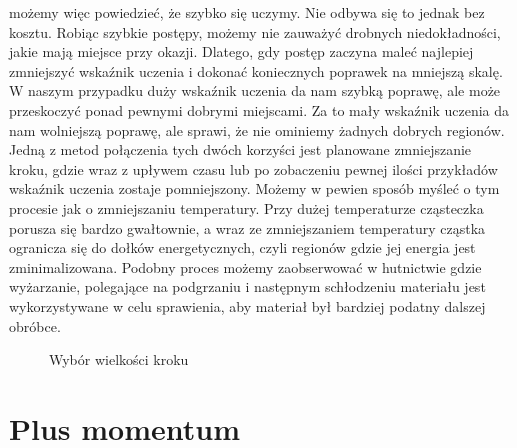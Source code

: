 możemy więc powiedzieć, że szybko się uczymy. Nie odbywa się to jednak bez kosztu. Robiąc szybkie postępy, możemy nie zauważyć drobnych niedokładności, jakie mają miejsce przy okazji. Dlatego, gdy postęp zaczyna maleć najlepiej zmniejszyć wskaźnik uczenia i dokonać koniecznych poprawek na mniejszą skalę. W naszym przypadku duży wskaźnik uczenia da nam szybką poprawę, ale może przeskoczyć ponad pewnymi dobrymi miejscami. Za to mały wskaźnik uczenia da nam wolniejszą poprawę, ale sprawi, że nie ominiemy żadnych dobrych regionów. Jedną z metod połączenia tych dwóch korzyści jest planowane zmniejszanie kroku, gdzie wraz z upływem czasu lub po zobaczeniu pewnej ilości przykładów wskaźnik uczenia zostaje pomniejszony. Możemy w pewien sposób myśleć o tym procesie jak o zmniejszaniu temperatury. Przy dużej temperaturze cząsteczka porusza się bardzo gwałtownie, a wraz ze zmniejszaniem temperatury cząstka ogranicza się do dołków energetycznych, czyli regionów gdzie jej energia jest zminimalizowana. Podobny proces możemy zaobserwować w hutnictwie gdzie wyżarzanie, polegające na podgrzaniu i następnym schłodzeniu materiału jest wykorzystywane w celu sprawienia, aby materiał był bardziej podatny dalszej obróbce.

\clearpage
\begin{figure}[H]
\centering

\caption{Wybór wielkości kroku}
\end{figure}
\clearpage

\section{Plus momentum}

